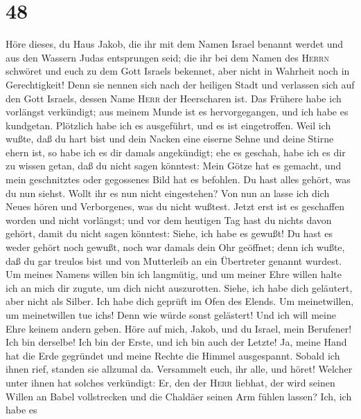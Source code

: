 \hypertarget{section-47}{%
\section{48}\label{section-47}}

 Höre dieses, du Haus Jakob, die ihr mit dem Namen Israel
benannt werdet und aus den Wassern Judas entsprungen seid; die ihr bei
dem Namen des \textsc{Herrn} schwöret und euch zu dem Gott Israels
bekennet, aber nicht in Wahrheit noch in Gerechtigkeit! 
Denn sie nennen sich nach der heiligen Stadt und verlassen sich auf den
Gott Israels, dessen Name \textsc{Herr} der Heerscharen ist.
 Das Frühere habe ich vorlängst verkündigt; aus meinem
Munde ist es hervorgegangen, und ich habe es kundgetan. Plötzlich habe
ich es ausgeführt, und es ist eingetroffen.  Weil ich
wußte, daß du hart bist und dein Nacken eine eiserne Sehne und deine
Stirne ehern ist,  so habe ich es dir damals angekündigt;
ehe es geschah, habe ich es dir zu wissen getan, daß du nicht sagen
könntest: Mein Götze hat es gemacht, und mein geschnitztes oder
gegossenes Bild hat es befohlen.  Du hast alles gehört,
was du nun siehst. Wollt ihr es nun nicht eingestehen? Von nun an lasse
ich dich Neues hören und Verborgenes, was du nicht wußtest.
 Jetzt erst ist es geschaffen worden und nicht vorlängst;
und vor dem heutigen Tag hast du nichts davon gehört, damit du nicht
sagen könntest: Siehe, ich habe es gewußt!  Du hast es
weder gehört noch gewußt, noch war damals dein Ohr geöffnet; denn ich
wußte, daß du gar treulos bist und von Mutterleib an ein Übertreter
genannt wurdest.  Um meines Namens willen bin ich
langmütig, und um meiner Ehre willen halte ich an mich dir zugute, um
dich nicht auszurotten.  Siehe, ich habe dich geläutert,
aber nicht als Silber. Ich habe dich geprüft im Ofen des Elends.
 Um meinetwillen, um meinetwillen tue
ich\textquotesingle s! Denn wie würde sonst gelästert! Und ich will
meine Ehre keinem andern geben.  Höre auf mich, Jakob,
und du Israel, mein Berufener! Ich bin derselbe! Ich bin der Erste, und
ich bin auch der Letzte!  Ja, meine Hand hat die Erde
gegründet und meine Rechte die Himmel ausgespannt. Sobald ich ihnen
rief, standen sie allzumal da.  Versammelt euch, ihr
alle, und höret! Welcher unter ihnen hat solches verkündigt: Er, den der
\textsc{Herr} liebhat, der wird seinen Willen an Babel vollstrecken und
die Chaldäer seinen Arm fühlen lassen?  Ich, ich habe es
